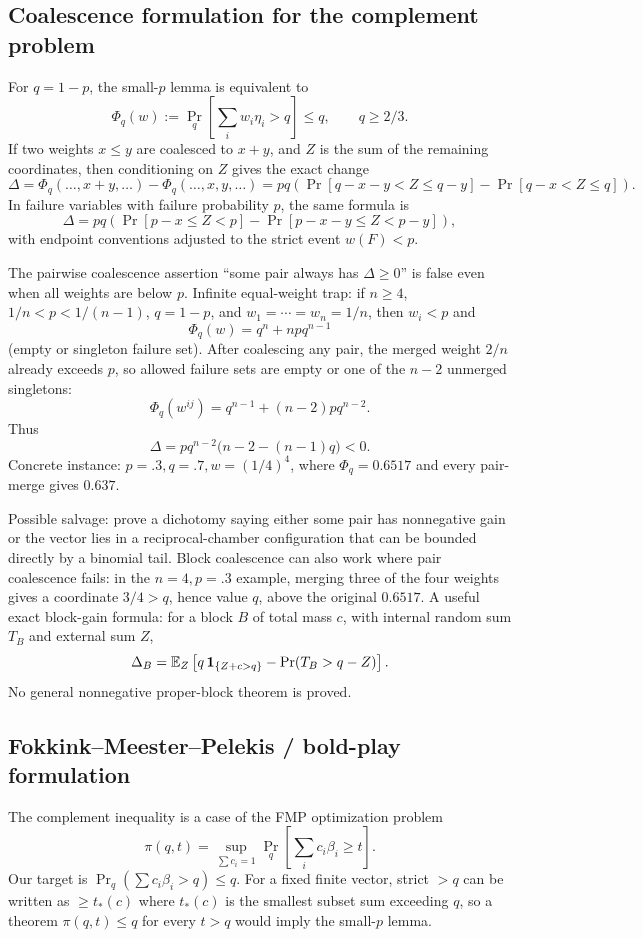 \documentclass[12pt]{article}
\begin{document}
\subsection*{Coalescence formulation for the complement problem}

For \(q=1-p\), the small-\(p\) lemma is equivalent to
\[
 \Phi_q(w):=\Pr_q\left[\sum_i w_i\eta_i>q\right]\le q,\qquad q\ge2/3.
\]
If two weights \(x\le y\) are coalesced to \(x+y\), and \(Z\) is the sum of
the remaining coordinates, then conditioning on \(Z\) gives the exact change
\[
 \Delta
 =\Phi_q(\ldots,x+y,\ldots)-\Phi_q(\ldots,x,y,\ldots)
 =pq\left(\Pr[q-x-y<Z\le q-y]-\Pr[q-x<Z\le q]\right).
\]
In failure variables with failure probability \(p\), the same formula is
\[
 \Delta=pq\left(\Pr[p-x\le Z<p]-\Pr[p-x-y\le Z<p-y]\right),
\]
with endpoint conventions adjusted to the strict event \(w(F)<p\).

The pairwise coalescence assertion ``some pair always has \(\Delta\ge0\)''
is false even when all weights are below \(p\).  Infinite equal-weight trap:
if \(n\ge4\), \(1/n<p<1/(n-1)\), \(q=1-p\), and
\(w_1=\cdots=w_n=1/n\), then \(w_i<p\) and
\[
 \Phi_q(w)=q^n+npq^{n-1}
\]
(empty or singleton failure set).  After coalescing any pair, the merged weight
\(2/n\) already exceeds \(p\), so allowed failure sets are empty or one of the
\(n-2\) unmerged singletons:
\[
 \Phi_q(w^{ij})=q^{n-1}+(n-2)pq^{n-2}.
\]
Thus
\[
 \Delta=pq^{n-2}\bigl(n-2-(n-1)q\bigr)<0.
\]
Concrete instance: \(p=.3,q=.7,w=(1/4)^4\), where
\(\Phi_q=0.6517\) and every pair-merge gives \(0.637\).

Possible salvage: prove a dichotomy saying either some pair has nonnegative
gain or the vector lies in a reciprocal-chamber configuration that can be
bounded directly by a binomial tail.  Block coalescence can also work where
pair coalescence fails: in the \(n=4,p=.3\) example, merging three of the four
weights gives a coordinate \(3/4>q\), hence value \(q\), above the original
\(0.6517\).  A useful exact block-gain formula: for a block \(B\) of total mass
\(c\), with internal random sum \(T_B\) and external sum \(Z\),
\[
 \Delta_B=\mathbb E_Z\left[
 q\,{\bf 1}_{\{Z+c>q\}}-\Pr(T_B>q-Z)
 \right].
\]
No general nonnegative proper-block theorem is proved.

\subsection*{Fokkink--Meester--Pelekis / bold-play formulation}

The complement inequality is a case of the FMP optimization problem
\[
 \pi(q,t)=\sup_{\sum c_i=1}\Pr_q\left[\sum_i c_i\beta_i\ge t\right].
\]
Our target is \(\Pr_q(\sum c_i\beta_i>q)\le q\).  For a fixed finite vector,
strict \(>q\) can be written as \(\ge t_*(c)\) where \(t_*(c)\) is the smallest
subset sum exceeding \(q\), so a theorem \(\pi(q,t)\le q\) for every \(t>q\)
would imply the small-\(p\) lemma.
\end{document}
